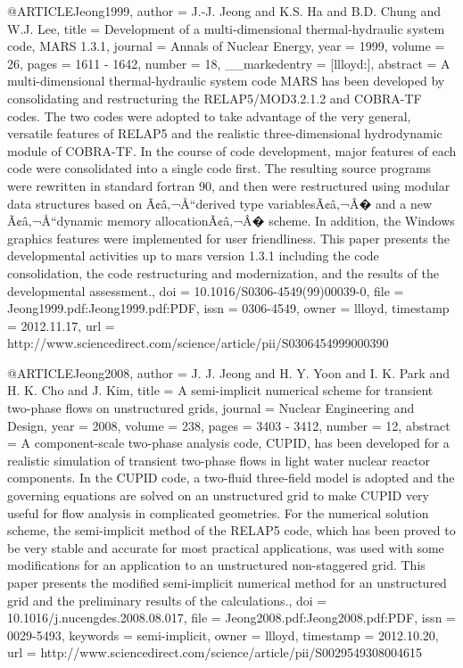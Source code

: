 {@ARTICLE{Jeong1999,
  author = {J.-J. Jeong and K.S. Ha and B.D. Chung and W.J. Lee},
  title = {Development of a multi-dimensional thermal-hydraulic system code,
	MARS 1.3.1},
  journal = {Annals of Nuclear Energy},
  year = {1999},
  volume = {26},
  pages = {1611 - 1642},
  number = {18},
  __markedentry = {[llloyd:]},
  abstract = {A multi-dimensional thermal-hydraulic system code MARS has been developed
	by consolidating and restructuring the RELAP5/MOD3.2.1.2 and COBRA-TF
	codes. The two codes were adopted to take advantage of the very general,
	versatile features of RELAP5 and the realistic three-dimensional
	hydrodynamic module of COBRA-TF. In the course of code development,
	major features of each code were consolidated into a single code
	first. The resulting source programs were rewritten in standard fortran
	90, and then were restructured using modular data structures based
	on Ã¢â‚¬Å“derived type variablesÃ¢â‚¬Â� and a new Ã¢â‚¬Å“dynamic
	memory allocationÃ¢â‚¬Â� scheme. In addition, the Windows graphics
	features were implemented for user friendliness. This paper presents
	the developmental activities up to mars version 1.3.1 including the
	code consolidation, the code restructuring and modernization, and
	the results of the developmental assessment.},
  doi = {10.1016/S0306-4549(99)00039-0},
  file = {Jeong1999.pdf:Jeong1999.pdf:PDF},
  issn = {0306-4549},
  owner = {llloyd},
  timestamp = {2012.11.17},
  url = {http://www.sciencedirect.com/science/article/pii/S0306454999000390}
}

@ARTICLE{Jeong2008,
  author = {J. J. Jeong and H. Y. Yoon and I. K. Park and H. K. Cho and J. Kim},
  title = {A semi-implicit numerical scheme for transient two-phase flows on
	unstructured grids},
  journal = {Nuclear Engineering and Design},
  year = {2008},
  volume = {238},
  pages = {3403 - 3412},
  number = {12},
  abstract = {A component-scale two-phase analysis code, CUPID, has been developed
	for a realistic simulation of transient two-phase flows in light
	water nuclear reactor components. In the CUPID code, a two-fluid
	three-field model is adopted and the governing equations are solved
	on an unstructured grid to make CUPID very useful for flow analysis
	in complicated geometries. For the numerical solution scheme, the
	semi-implicit method of the RELAP5 code, which has been proved to
	be very stable and accurate for most practical applications, was
	used with some modifications for an application to an unstructured
	non-staggered grid. This paper presents the modified semi-implicit
	numerical method for an unstructured grid and the preliminary results
	of the calculations.},
  doi = {10.1016/j.nucengdes.2008.08.017},
  file = {Jeong2008.pdf:Jeong2008.pdf:PDF},
  issn = {0029-5493},
  keywords = {semi-implicit},
  owner = {llloyd},
  timestamp = {2012.10.20},
  url = {http://www.sciencedirect.com/science/article/pii/S0029549308004615}
}

}

